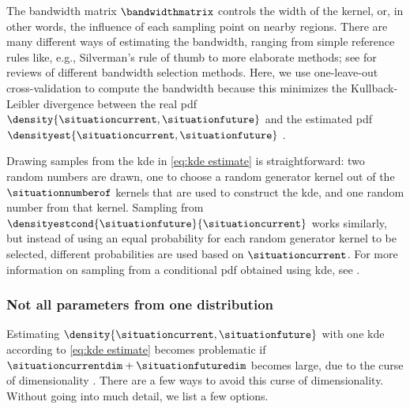 The bandwidth matrix $\bandwidthmatrix$ controls the width of the kernel, or, in other words, the influence of each sampling point on nearby regions. 
There are many different ways of estimating the bandwidth, ranging from simple reference rules like, e.g., Silverman's rule of thumb \autocite{silverman1986density} to more elaborate methods; see \autocite{turlach1993bandwidthselection, chiu1996comparative, jones1996brief, bashtannyk2001bandwidth, zambom2013review} for reviews of different bandwidth selection methods.
Here, we use one-leave-out cross-validation to compute the bandwidth because this minimizes the Kullback-Leibler divergence between the real \ac{pdf} $\density{\situationcurrent, \situationfuture}$ and the estimated \ac{pdf} $\densityest{\situationcurrent, \situationfuture}$ \autocite{turlach1993bandwidthselection, zambom2013review}.

Drawing samples from the \ac{kde} in \cref{eq:kde estimate} is straightforward: two random numbers are drawn, one to choose a random generator kernel out of the $\situationnumberof$ kernels that are used to construct the \ac{kde}, and one random number from that kernel.
Sampling from $\densityestcond{\situationfuture}{\situationcurrent}$ works similarly, but instead of using an equal probability for each random generator kernel to be selected, different probabilities are used based on $\situationcurrent$.
For more information on sampling from a conditional \ac{pdf} obtained using \ac{kde}, see \autocite{holmes2012fast, degelder2021conditional}.



\subsubsection{Not all parameters from one distribution}
\label{sec:no special case}

Estimating $\density{\situationcurrent, \situationfuture}$ with one \ac{kde} according to \cref{eq:kde estimate} becomes problematic if $\situationcurrentdim + \situationfuturedim$ becomes large, due to the curse of dimensionality \cite{scott2015multivariate}.
There are a few ways to avoid this curse of dimensionality.
Without going into much detail, we list a few options.

